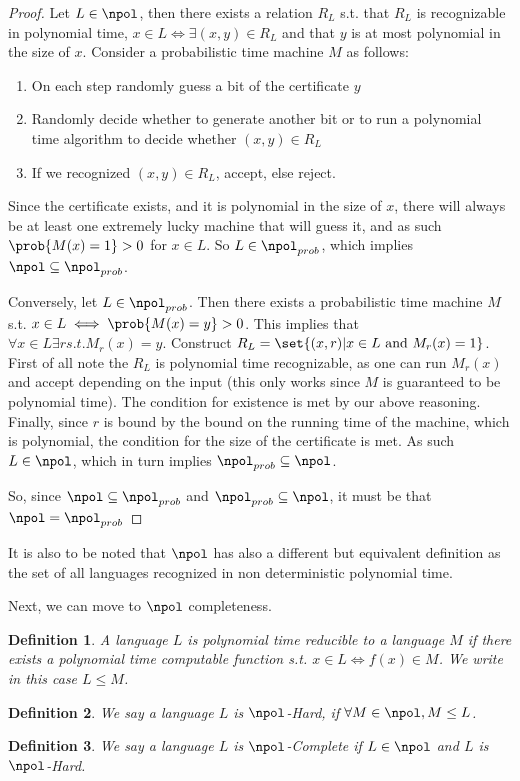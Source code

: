 \documentclass{article}
\newtheorem{definition}{Definition}
\begin{document}
\begin{proof}
    Let $L \in \npol$, then there exists a relation $R_L$ s.t. that $R_L$ is recognizable in polynomial time, $x \in L \iff \exists (x, y) \in R_L$ and that $y$ is at most polynomial in the size of $x$. Consider a probabilistic time machine $M$ as follows:
    \begin{enumerate}
        \item On each step randomly guess a bit of the certificate $y$
        \item Randomly decide whether to generate another bit or to run a polynomial time algorithm to decide whether $(x, y) \in R_L$
        \item If we recognized $(x, y) \in R_L$, accept, else reject.
    \end{enumerate}

    Since the certificate exists, and it is polynomial in the size of $x$, there will always be at least one extremely lucky machine that will guess it, and as such $\prob{M(x) = 1} > 0$ for $x \in L$. So $L \in \npol_{prob}$, which implies $\npol \subseteq \npol_{prob}$.

    Conversely, let $L \in \npol_{prob}$. Then there exists a probabilistic time machine $M$ s.t. $x \in L \iff \prob{M(x) = y} > 0$. This implies that $\forall x \in L\exists r s.t. M_r(x) = y$. Construct $R_L = \set{ (x, r) | x \in L \text { and } M_r(x) = 1 }$. First of all note the $R_L$ is polynomial time recognizable, as one can run $M_r(x)$ and accept depending on the input (this only works since $M$ is guaranteed to be polynomial time). The condition for existence is met by our above reasoning. Finally, since $r$ is bound by the bound on the running time of the machine, which is polynomial, the condition for the size of the certificate is met. As such $L \in \npol$, which in turn implies $\npol_{prob} \subseteq \npol$. \par

    So, since $\npol \subseteq \npol_{prob}$ and $\npol_{prob} \subseteq \npol$, it must be that $\npol = \npol_{prob}$


\end{proof}

It is also to be noted that $\npol$ has also a different but equivalent definition as the set of all languages recognized in non deterministic polynomial time. \par

Next, we can move to $\npol$ completeness.
\begin{definition}
    A language $L$ is polynomial time reducible to a language $M$ if there exists a polynomial time computable function s.t. $x \in L \iff f(x) \in M$. We write in this case $L \leq M$.
\end{definition}
\begin{definition}
    We say a language $L$ is $\npol$-Hard, if $\forall M \in \npol, M \leq L$.
\end{definition}
\begin{definition}
    We say a language $L$ is $\npol$-Complete if $L \in \npol$ and $L$ is $\npol$-Hard.
\end{definition}
\end{document}
